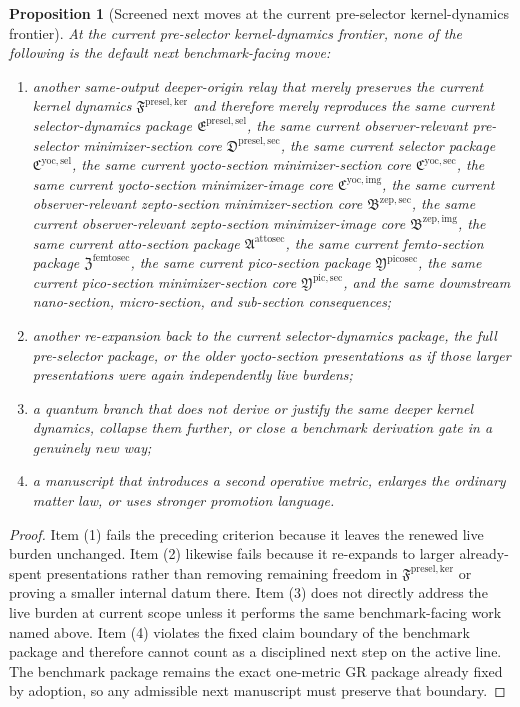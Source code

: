 \documentclass[11pt]{article}
\newcommand{\KernelPackage}{\mathfrak F^{\mathrm{presel,ker}}}
\newcommand{\PreSectionSelectorPackage}{\mathfrak E^{\mathrm{presel,sel}}}
\newcommand{\PreSelectorMinSectionCore}{\mathfrak D^{\mathrm{presel,sec}}}
\newcommand{\YoctoSelectorPackage}{\mathfrak C^{\mathrm{yoc,sel}}}
\newcommand{\YoctoImageCore}{\mathfrak C^{\mathrm{yoc,img}}}
\newcommand{\YoctoMinSectionCore}{\mathfrak C^{\mathrm{yoc,sec}}}
\newcommand{\ZeptoImageCore}{\mathfrak B^{\mathrm{zep,img}}}
\newcommand{\ZeptoMinSectionCore}{\mathfrak B^{\mathrm{zep,sec}}}
\newcommand{\AttoSectionPackage}{\mathfrak A^{\mathrm{attosec}}}
\newcommand{\FemtoSectionPackage}{\mathfrak Z^{\mathrm{femtosec}}}
\newcommand{\PicoSectionPackage}{\mathfrak Y^{\mathrm{picosec}}}
\newcommand{\PicoMinSectionCore}{\mathfrak Y^{\mathrm{pic,sec}}}
\newtheorem{proposition}{Proposition}
\begin{document}
\begin{proposition}[Screened next moves at the current pre-selector kernel-dynamics frontier]
At the current pre-selector kernel-dynamics frontier, none of the following is the default next benchmark-facing move:
\begin{enumerate}
    \item another same-output deeper-origin relay that merely preserves the current kernel dynamics \(\KernelPackage\) and therefore merely reproduces the same current selector-dynamics package \(\PreSectionSelectorPackage\), the same current observer-relevant pre-selector minimizer-section core \(\PreSelectorMinSectionCore\), the same current selector package \(\YoctoSelectorPackage\), the same current yocto-section minimizer-section core \(\YoctoMinSectionCore\), the same current yocto-section minimizer-image core \(\YoctoImageCore\), the same current observer-relevant zepto-section minimizer-section core \(\ZeptoMinSectionCore\), the same current observer-relevant zepto-section minimizer-image core \(\ZeptoImageCore\), the same current atto-section package \(\AttoSectionPackage\), the same current femto-section package \(\FemtoSectionPackage\), the same current pico-section package \(\PicoSectionPackage\), the same current pico-section minimizer-section core \(\PicoMinSectionCore\), and the same downstream nano-section, micro-section, and sub-section consequences;
    \item another re-expansion back to the current selector-dynamics package, the full pre-selector package, or the older yocto-section presentations as if those larger presentations were again independently live burdens;
    \item a quantum branch that does not derive or justify the same deeper kernel dynamics, collapse them further, or close a benchmark derivation gate in a genuinely new way;
    \item a manuscript that introduces a second operative metric, enlarges the ordinary matter law, or uses stronger promotion language.
\end{enumerate}
\end{proposition}

\begin{proof}
Item (1) fails the preceding criterion because it leaves the renewed live burden unchanged. Item (2) likewise fails because it re-expands to larger already-spent presentations rather than removing remaining freedom in \(\KernelPackage\) or proving a smaller internal datum there. Item (3) does not directly address the live burden at current scope unless it performs the same benchmark-facing work named above. Item (4) violates the fixed claim boundary of the benchmark package and therefore cannot count as a disciplined next step on the active line. The benchmark package remains the exact one-metric GR package already fixed by adoption, so any admissible next manuscript must preserve that boundary.
\end{proof}
\end{document}
